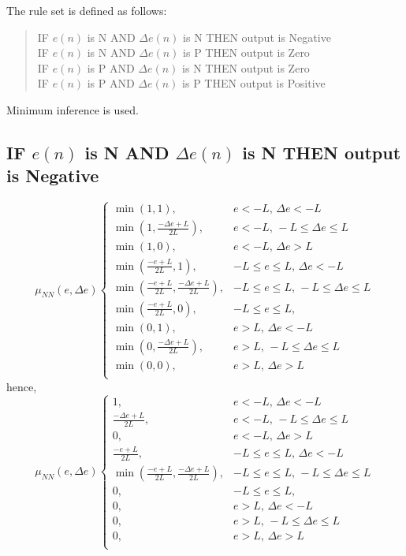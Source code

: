The rule set is defined as follows:
\begin{quote}
IF $e(n)$ is N AND $\Delta e(n)$ is N THEN output is Negative\\
IF $e(n)$ is N AND $\Delta e(n)$ is P THEN output is Zero\\
IF $e(n)$ is P AND $\Delta e(n)$ is N THEN output is Zero\\
IF $e(n)$ is P AND $\Delta e(n)$ is P THEN output is Positive
\end{quote}
Minimum inference is used.
\subsection{IF $e(n)$ is N AND $\Delta e(n)$ is N THEN output is Negative}
\begin{equation}
\mu_{NN}(e,\Delta e)\begin{cases}
    \min{\left(1,1\right)},& e<-L ,\, \Delta e<-L\\
    \min{\left(1,\frac{-\Delta e+L}{2L}\right)},& e<-L ,\, -L\leq \Delta e\leq L\\
    \min{\left(1,0\right)},& e<-L ,\, \Delta e>L\\
    \min{\left(\frac{-e+L}{2L},1\right)},& -L\leq e\leq L ,\, \Delta e<-L\\
    \min{\left(\frac{-e+L}{2L},\frac{-\Delta e+L}{2L}\right)},& -L\leq e\leq L ,\, -L\leq \Delta e\leq L\\
    \min{\left(\frac{-e+L}{2L},0\right)},& -L\leq e\leq L ,\, \\
    \min{\left(0,1\right)},& e>L ,\,\Delta e<-L \\
    \min{\left(0,\frac{-\Delta e+L}{2L}\right)},& e>L ,\, -L\leq \Delta e\leq L\\
    \min{\left(0,0\right)},& e>L ,\, \Delta e>L\\
\end{cases}
\end{equation}
hence,
\begin{equation}
\mu_{NN}(e,\Delta e)\begin{cases}
    1,& e<-L ,\, \Delta e<-L\\
    \frac{-\Delta e+L}{2L},& e<-L ,\, -L\leq \Delta e\leq L\\
    0,& e<-L ,\, \Delta e>L\\
    \frac{-e+L}{2L},& -L\leq e\leq L ,\, \Delta e<-L\\
    \min{\left(\frac{-e+L}{2L},\frac{-\Delta e+L}{2L}\right)},& -L\leq e\leq L ,\, -L\leq \Delta e\leq L\\
    0,& -L\leq e\leq L ,\, \\
    0,& e>L ,\,\Delta e<-L \\
    0,& e>L ,\, -L\leq \Delta e\leq L\\
    0,& e>L ,\, \Delta e>L\\
\end{cases}
\end{equation}


